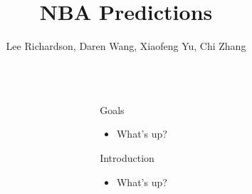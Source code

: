 \documentclass[final, 14pt]{beamer}
\title{NBA Predictions}%
\author{Lee Richardson, Daren Wang, Xiaofeng Yu, Chi Zhang} %
\institute{Carnegie Mellon University} %
\newlength{\sepwid}
\newlength{\onecolwid}
\begin{document}

\setlength{\belowcaptionskip}{2ex} %
\setlength\belowdisplayshortskip{2ex} %

\begin{frame}[t] %

\begin{columns}[t] %

\begin{column}{\sepwid}\end{column} %

\begin{column}{\onecolwid} %


\begin{block}{Goals}

\begin{itemize}

  \item What's up?

\end{itemize}

\end{block}


\begin{block}{Introduction}

  
\begin{itemize}

  \item What's up?

\end{itemize}

\end{block}


\end{column}
\end{columns}
\end{frame}
\end{document}
